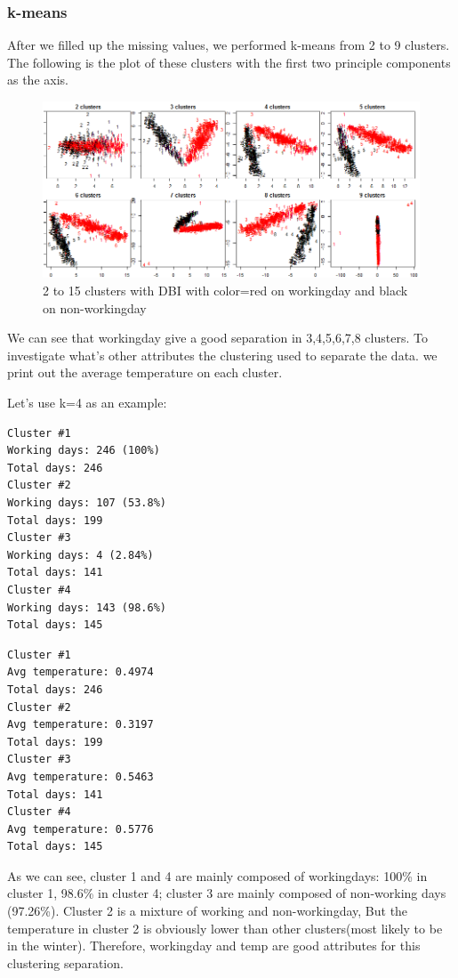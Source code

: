 \documentclass[12pt]{article}
\begin{document}
\subsubsection{k-means}	

After we filled up the missing values, we performed k-means from 2 to 9 clusters. The following is the plot of these clusters with the first two principle components as the axis.
	\begin{figure}[H]
		\centering
		\includegraphics[scale=.65]{figures/kmeans_workingday.png}
		\caption{2 to 15 clusters with DBI with color=red on workingday and black on non-workingday}
	\end{figure}

We can see that workingday give a good separation in 3,4,5,6,7,8 clusters. To investigate what's other attributes the clustering used to 	separate the data. we print out the average temperature on each cluster.

Let's use k=4 as an example: \color{blue}
\begin{multicols}{2}
	\begin{verbatim}
Cluster #1
Working days: 246 (100%)
Total days: 246
Cluster #2
Working days: 107 (53.8%)
Total days: 199
Cluster #3
Working days: 4 (2.84%)
Total days: 141
Cluster #4
Working days: 143 (98.6%)
Total days: 145
	\end{verbatim}
	\columnbreak
	\begin{verbatim}
Cluster #1
Avg temperature: 0.4974
Total days: 246
Cluster #2
Avg temperature: 0.3197
Total days: 199
Cluster #3
Avg temperature: 0.5463
Total days: 141
Cluster #4
Avg temperature: 0.5776
Total days: 145
	\end{verbatim}
\end{multicols} 
\color{black}
As we can see, cluster 1 and 4 are mainly composed of workingdays: 100\% in cluster 1, 98.6\% in cluster 4; cluster 3 are mainly composed of non-working days (97.26\%).  Cluster 2 is a mixture of working and non-workingday, But the temperature in cluster 2 is obviously lower than other clusters(most likely to be in the winter). Therefore, workingday and temp are good attributes for this clustering separation.
\end{document}
